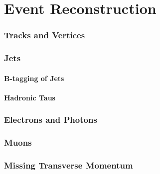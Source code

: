 \chapter{Event Reconstruction}
\label{sec:event:reco}

\subsection{Tracks and Vertices}
\label{sec:reco:tracks}

\subsection{Jets}

\subsubsection{B-tagging of Jets}

\subsubsection{Hadronic Taus}

\subsection{Electrons and Photons}

\subsection{Muons}

\subsection{Missing Transverse Momentum}
